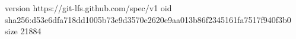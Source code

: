 version https://git-lfs.github.com/spec/v1
oid sha256:d53e6dfa718dd1005b73e9d3570e2620e9aa013b86f2345161fa7517f940f3b0
size 21884
